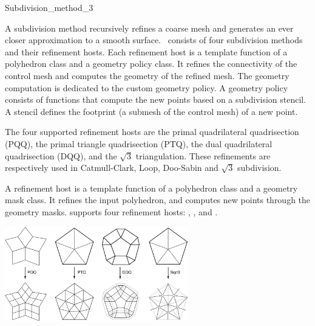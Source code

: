 
\ccRefPageBegin



\begin{ccRefClass}{Subdivision_method_3}

\ccDefinition

A subdivision method recursively refines a coarse mesh and 
generates an ever closer approximation to a smooth surface.
\ccClassTemplateName\ consists of four subdivision methods
and their refinement hosts. Each refinement host is a template 
function of a polyhedron class and a 
geometry policy class. It refines the connectivity of the
control mesh and computes the geometry of the refined mesh.
The geometry computation is dedicated to the custom
geometry policy. A geometry policy consists of functions 
that compute the new points based on a subdivision stencil.
A stencil defines the footprint (a submesh of the control mesh)
of a new point.

The four supported refinement hosts are the 
primal quadrilateral quadrisection (PQQ),
the primal triangle quadrisection (PTQ), 
the dual quadrilateral quadrisection (DQQ), 
and the $\sqrt{3}$ triangulation.
These refinements are respectively used in 
Catmull-Clark, Loop, Doo-Sabin and $\sqrt{3}$ subdivision.


A refinement host is a template function of 
a polyhedron class and a geometry mask class. It refines
the input polyhedron, and computes new points through 
the geometry masks.
 supports four refinement hosts:
, ,  and .

\begin{ccTexOnly}
  \begin{center}
    \parbox{0.6\textwidth}{%
      \includegraphics[width=0.6\textwidth]{Subdivision_method_3_ref/FIG/RefSchemes}%
    }\\ \vspace{0.5cm}
  \end{center}
\end{ccTexOnly}


\end{ccRefClass}
